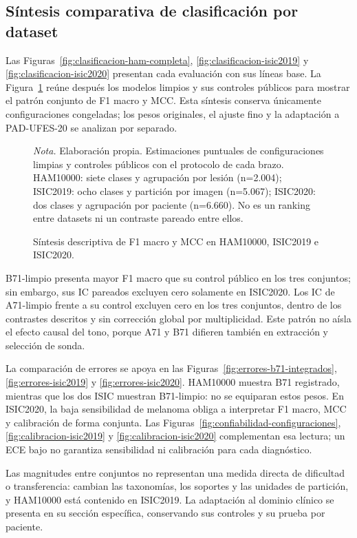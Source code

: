 \subsection{Síntesis comparativa de clasificación por dataset}\label{sec:sintesis-datasets}
Las Figuras~\ref{fig:clasificacion-ham-completa}, \ref{fig:clasificacion-isic2019} y \ref{fig:clasificacion-isic2020} presentan cada evaluación con sus líneas base. La Figura~\ref{fig:sintesis-datasets} reúne después los modelos limpios y sus controles públicos para mostrar el patrón conjunto de F1 macro y MCC. Esta síntesis conserva únicamente configuraciones congeladas; los pesos originales, el ajuste fino y la adaptación a PAD-UFES-20 se analizan por separado.

\begin{figure}[!htbp]
\caption{Síntesis descriptiva de F1 macro y MCC en HAM10000, ISIC2019 e ISIC2020.}\label{fig:sintesis-datasets}
\centering

\par\smallskip
{\singlespacing\fontsize{11}{13}\selectfont\raggedright
\noindent\textit{Nota.} Elaboración propia. Estimaciones puntuales de configuraciones limpias y controles públicos con el protocolo de cada brazo. HAM10000: siete clases y agrupación por lesión (n=2.004); ISIC2019: ocho clases y partición por imagen (n=5.067); ISIC2020: dos clases y agrupación por paciente (n=6.660). No es un ranking entre datasets ni un contraste pareado entre ellos.\par}
\end{figure}
\FloatBarrier
B71-limpio presenta mayor F1 macro que su control público en los tres conjuntos; sin embargo, sus IC pareados excluyen cero solamente en ISIC2020. Los IC de A71-limpio frente a su control excluyen cero en los tres conjuntos, dentro de los contrastes descritos y sin corrección global por multiplicidad. Este patrón no aísla el efecto causal del tono, porque A71 y B71 difieren también en extracción y selección de sonda.

La comparación de errores se apoya en las Figuras~\ref{fig:errores-b71-integrados}, \ref{fig:errores-isic2019} y \ref{fig:errores-isic2020}. HAM10000 muestra B71 registrado, mientras que los dos ISIC muestran B71-limpio: no se equiparan estos pesos. En ISIC2020, la baja sensibilidad de melanoma obliga a interpretar F1 macro, MCC y calibración de forma conjunta. Las Figuras~\ref{fig:confiabilidad-configuraciones}, \ref{fig:calibracion-isic2019} y \ref{fig:calibracion-isic2020} complementan esa lectura; un ECE bajo no garantiza sensibilidad ni calibración para cada diagnóstico.

Las magnitudes entre conjuntos no representan una medida directa de dificultad o transferencia: cambian las taxonomías, los soportes y las unidades de partición, y HAM10000 está contenido en ISIC2019. La adaptación al dominio clínico se presenta en su sección específica, conservando sus controles y su prueba por paciente.
\FloatBarrier
